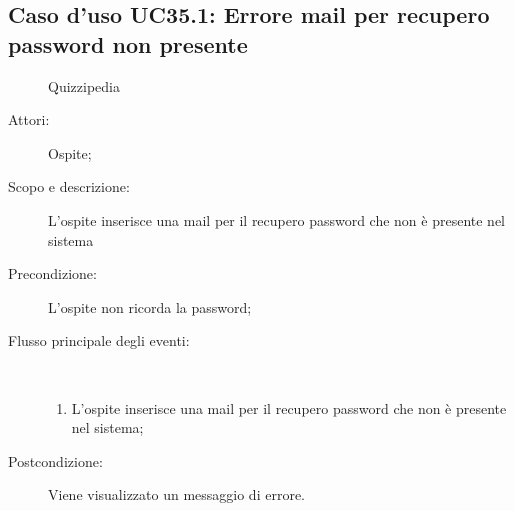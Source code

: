 \subsection{Caso d'uso UC35.1: Errore mail per recupero password non presente}
	\begin{figure}[H]
		\centering
		\begin{resizedtikzpicture}{\textwidth}
		\begin{umlsystem}[x=0, fill=lightgray!20]{Quizzipedia}
		\end{umlsystem}
		\end{resizedtikzpicture}
		\caption{}
	\end{figure}
\begin{description}
\item[Attori:] Ospite;
\item[Scopo e descrizione:] L'ospite inserisce una mail per il recupero password che non è presente nel sistema
      \item[Precondizione:] L'ospite non ricorda la password;

        \item[Flusso principale degli eventi:] \ 
 \begin{enumerate}
          \item L'ospite inserisce una mail per il recupero password che non è presente nel sistema;

      \end{enumerate}
    \item[Postcondizione:] Viene visualizzato un messaggio di errore.
  \end{description}
 
